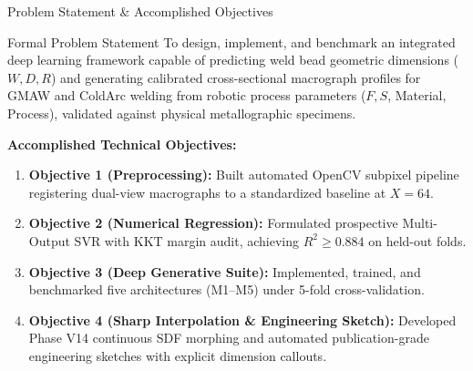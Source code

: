 \documentclass[aspectratio=169]{beamer}
\begin{document}
\begin{frame}{Problem Statement \& Accomplished Objectives}
	\begin{block}{Formal Problem Statement}
		To design, implement, and benchmark an integrated deep learning framework capable of predicting weld bead geometric dimensions ($W, D, R$) and generating calibrated cross-sectional macrograph profiles for GMAW and ColdArc welding from robotic process parameters ($F, S$, Material, Process), validated against physical metallographic specimens.
	\end{block}
	
	\vspace{0.2cm}
	\textbf{Accomplished Technical Objectives:}
	\begin{enumerate}
		\item \textbf{Objective 1 (Preprocessing):} Built automated OpenCV subpixel pipeline registering dual-view macrographs to a standardized baseline at $X=64$.
		\item \textbf{Objective 2 (Numerical Regression):} Formulated prospective Multi-Output SVR with KKT margin audit, achieving $R^2 \ge 0.884$ on held-out folds.
		\item \textbf{Objective 3 (Deep Generative Suite):} Implemented, trained, and benchmarked five architectures (M1--M5) under 5-fold cross-validation.
		\item \textbf{Objective 4 (Sharp Interpolation \& Engineering Sketch):} Developed Phase V14 continuous SDF morphing and automated publication-grade engineering sketches with explicit dimension callouts.
	\end{enumerate}
\end{frame}
\end{document}
